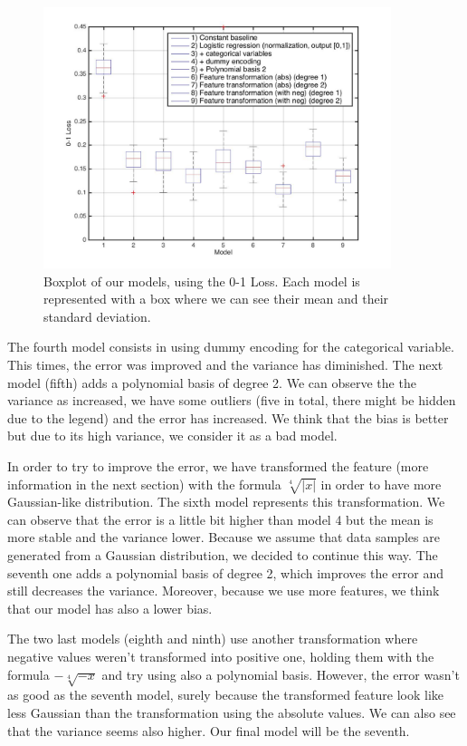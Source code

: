 \documentclass{article} %
\begin{document}
\begin{figure}
\center
\includegraphics[width=4in]{figures/models_classification.jpg} 
\vspace{-1em}
\caption{Boxplot of our models, using the 0-1 Loss. Each model is represented with a box where we can see their mean and their standard deviation.}
\label{fig:models_classification}
\vspace{-0.5em}
\end{figure}

The fourth model consists in using dummy encoding for the categorical variable. This times, the error was improved and the variance has diminished. The next model (fifth) adds a polynomial basis of degree 2. We can observe the the variance as increased, we have some outliers (five in total, there might be hidden due to the legend) and the error has increased. We think that the bias is better but due to its high variance, we consider it as a bad model.

In order to try to improve the error, we have transformed the feature (more information in the next section) with the formula $\sqrt[4]{|x|}$ in order to have more Gaussian-like distribution. The sixth model represents this transformation. We can observe that the error is a little bit higher than model 4 but the mean is more stable and the variance lower. Because we assume that data samples are generated from a Gaussian distribution, we decided to continue this way. The seventh one adds a polynomial basis of degree 2, which improves the error and still decreases the variance. Moreover, because we use more features, we think that our model has also a lower bias.

The two last models (eighth and ninth) use another transformation where negative values weren't transformed into positive one, holding them with the formula $-\sqrt[4]{-x}$ and try using also a polynomial basis. However, the error wasn't as good as the seventh model, surely because the transformed feature look like less Gaussian than the transformation using the absolute values. We can also see that the variance seems also higher.
Our final model will be the seventh.
\end{document}
